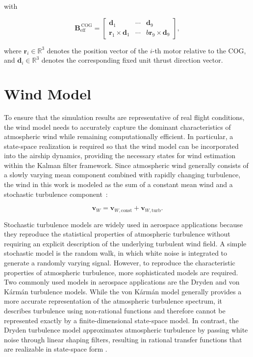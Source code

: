 with

\begin{equation}
	\bm{B}_{\mathrm{eff}}^{\,\mathrm{COG}}
	=
	\begin{bmatrix}
		\bm{d}_1 &
		\cdots &
		\bm{d}_9
		\\[4pt]
		\bm{r}_1 \times \bm{d}_1 &
		\cdots &b
		\bm{r}_9 \times \bm{d}_9
	\end{bmatrix},
\end{equation}

where $\bm{r}_i \in \mathbb{R}^3$ denotes the position vector of the $i$-th motor relative to the COG, and $\bm{d}_i \in \mathbb{R}^3$ denotes the corresponding fixed unit thrust direction vector.





\section{Wind Model}
\label{sec:2.3WindModel}

To ensure that the simulation results are representative of real flight conditions, the wind model needs to accurately capture the dominant characteristics of atmospheric wind while remaining computationally efficient. In particular, a state-space realization is required so that the wind model can be incorporated into the airship dynamics, providing the necessary states for wind estimation within the Kalman filter framework. Since atmospheric wind generally consists of a slowly varying mean component combined with rapidly changing turbulence, the wind in this work is modeled as the sum of a constant mean wind and a stochastic turbulence component~\cite{Etkin1995Dynamics}:

\begin{equation}
	\bm{v}_W = \bm{v}_{W, \mathrm{const}} + \bm{v}_{W, \mathrm{turb}}.
\end{equation}

Stochastic turbulence models are widely used in aerospace applications because they reproduce the statistical properties of atmospheric turbulence without requiring an explicit description of the underlying turbulent wind field. A simple stochastic model is the random walk, in which white noise is integrated to generate a randomly varying signal.
However, to reproduce the characteristic properties of atmospheric turbulence, more sophisticated models are required.
Two commonly used models in aerospace applications are the Dryden and von Kármán turbulence models. While the von Kármán model generally provides a more accurate representation of the atmospheric turbulence spectrum, it describes turbulence using non-rational functions and therefore cannot be represented exactly by a finite-dimensional state-space model. In contrast, the Dryden turbulence model approximates atmospheric turbulence by passing white noise through linear shaping filters, resulting in rational transfer functions that are realizable in state-space form \cite{Hoblit1988Gust, MILHDBK1797}. 

